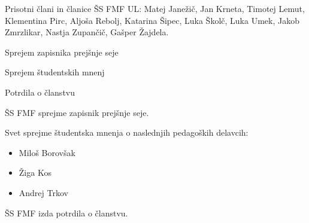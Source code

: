 \documentclass{seja}
\begin{document}
Prisotni člani in članice ŠS FMF UL:
Matej Janežič,
Jan Krneta,
Timotej Lemut,
Klementina Pirc,
Aljoša Rebolj,
Katarina Šipec,
Luka Školč,
Luka Umek,
Jakob Zmrzlikar,
Nastja Zupančič,
Gašper Žajdela.

\begin{red}
	\item
	Sprejem zapisnika prejšnje seje
    \item
    Sprejem študentskih mnenj
	\item Potrdila o članstvu
\end{red}

\begin{ad}
    \item
    \begin{sklep*}
        ŠS FMF sprejme zapisnik prejšnje seje.
    \end{sklep*}
    
    \item
    \begin{sklep*}
    Svet sprejme študentska mnenja o naslednjih pedagoških delavcih:
    \begin{itemize}
        \item Miloš Borovšak
        \item Žiga Kos
        \item Andrej Trkov
    \end{itemize}
    \end{sklep*}
    
    	\item
	\begin{sklep*}
		ŠS FMF izda potrdila o članstvu.
	\end{sklep*}
\end{ad}

\makeatletter \global\let\@enddocumenthook\@empty \makeatother
{}
\end{document}
